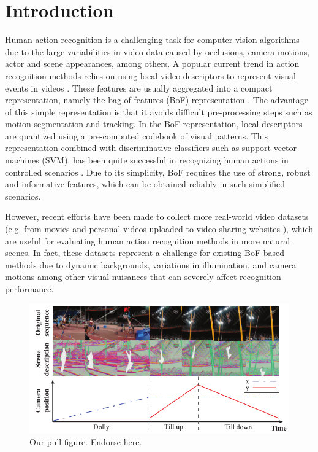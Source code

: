 \section{Introduction} \label{introduction}
Human action recognition is a challenging task for computer vision algorithms due to the large variabilities in video data caused by occlusions, camera motions, actor and scene appearances, among others. A popular current trend in action recognition methods relies on using local video descriptors to represent visual events in videos \cite{laptev2005, dollar2005, wang2011}. These features are usually aggregated into a compact representation, namely the bag-of-features (BoF) representation \cite{laptev2008}. The advantage of this simple representation is that it avoids difficult pre-processing steps such as motion segmentation and tracking. In the BoF representation, local descriptors are quantized using a pre-computed codebook of visual patterns. This representation combined with discriminative classifiers such as support vector machines (SVM), has been quite successful in recognizing human actions  in controlled scenarios \cite{blank2005, schuldt2004}. Due to its simplicity, BoF requires the use of strong, robust and informative features, which can be obtained reliably in such simplified scenarios. 

However, recent efforts have been made to collect more real-world video datasets (e.g. from movies and personal videos uploaded to video sharing websites  \cite{kuehne2011,  marszalek2009}), which are useful for evaluating human action recognition methods in more natural scenes. In fact, these datasets represent a challenge for existing BoF-based methods due to dynamic backgrounds, variations in illumination, and camera motions among other visual nuisances that can severely affect recognition performance.



\begin{figure}[ht]
\begin{center}
\includegraphics[width=0.98\linewidth]{fig/PullFigure.pdf}
\end{center}
\caption{Our pull figure. Endorse here.}
\label{fig:pull_figure}
\end{figure}



